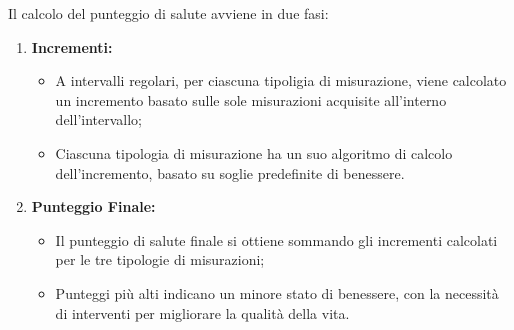 Il calcolo del punteggio di salute avviene in due fasi:
\begin{enumerate}
    \item \textbf{Incrementi:} 
    \begin{itemize}
        \item A intervalli regolari, per ciascuna tipoligia di misurazione, viene calcolato un incremento basato sulle sole misurazioni acquisite all'interno dell'intervallo;
        \item Ciascuna tipologia di misurazione ha un suo algoritmo di calcolo dell'incremento, basato su soglie predefinite di benessere.
    \end{itemize}
    \item \textbf{Punteggio Finale:}
    \begin{itemize}
        \item Il punteggio di salute finale si ottiene sommando gli incrementi calcolati per le tre tipologie di misurazioni;
        \item Punteggi più alti indicano un minore stato di benessere, con la necessità di interventi per migliorare la qualità della vita.
    \end{itemize}
\end{enumerate}

